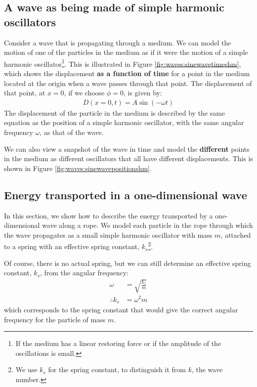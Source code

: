 \subsection{A wave as being made of simple harmonic oscillators}
Consider a wave that is propagating through a medium. We can model the motion of one of the particles in the medium as if it were the motion of a simple harmonic oscillator\footnote{If the medium has a linear restoring force or if the amplitude of the oscillations is small.}. This is illustrated in Figure \ref{fig:waves:sinewavetimeshm}, which shows the displacement \textbf{as a function of time} for a point in the medium located at the origin when a wave passes through that point. The displacement of that point, at $x=0$, if we choose $\phi=0$, is given by:
\begin{align*}
D(x=0,t) = A\sin(-\omega t)
\end{align*}
The displacement of the particle in the medium is described by the same equation as the position of a simple harmonic oscillator, with the same angular frequency $\omega$, as that of the wave. 

We can also view a snapshot of the wave in time and model the \textbf{different} points in the medium as different oscillators that all have different displacements. This is shown in Figure \ref{fig:waves:sinewavepositionshm}.

\subsection{Energy transported in a one-dimensional wave}
In this section, we show how to describe the energy transported by a one-dimensional wave along a rope. We model each particle in the rope through which the wave propagates as a small simple harmonic oscillator with mass $m$, attached to a spring with an effective spring constant, $k_s$\footnote{We use $k_s$ for the spring constant, to distinguish it from $k$, the wave number.}.

Of course, there is no actual spring, but we can still determine an effective spring constant, $k_s$, from the angular frequency:
\begin{align*}
\omega &= \sqrt{\frac{k_s}{m}}\\
\therefore k_s &= \omega^2 m
\end{align*}
which corresponds to the spring constant that would give the correct angular frequency for the particle of mass $m$.

